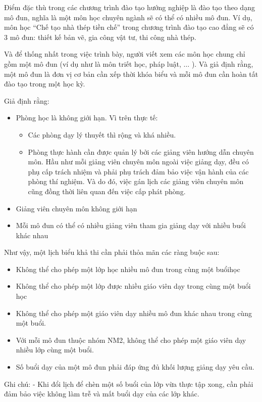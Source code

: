 \documentclass[11pt]{article}
\begin{document}
Điểm đặc thù trong các chương trình đào tạo hướng nghiệp là đào tạo theo dạng mô đun, nghĩa là một môn học chuyên ngành sẽ có thể có nhiều mô đun. Ví dụ, môn học “Chế tạo nhà thép tiền chế” trong chương trình đào tạo cao đẳng sẽ có 3 mô đun: thiết kế bản vẽ, gia công vật tư, thi công nhà thép.

Và để thống nhất trong việc trình bày, người viết xem các môn học chung chỉ gồm một mô đun (ví dụ như là môn triết học, pháp luật, $\ldots$ ). Và giả định rằng, một mô đun là đơn vị cơ bản cần xếp thời khóa biểu và mỗi mô đun cần hoàn tất đào tạo trong một học kỳ.

Giả định rằng:
\begin{itemize}
\item	Phòng học là không giới hạn. Vì trên thực tế:
\begin{itemize}
	\item Các phòng dạy lý thuyết thì rộng và khá nhiều. 
	\item Phòng thực hành cần được quản lý bởi các giảng viên hướng dẫn chuyên môn. Hầu như mỗi giảng viên chuyên môn ngoài việc giảng dạy, đều có phụ cấp trách nhiệm và phải phụ trách đảm bảo việc vận hành của các phòng thí nghiệm. Và do đó, việc gán lịch các giảng viên chuyên môn cũng đồng thời liên quan đến việc cấp phát phòng.
\end{itemize}
\item	Giảng viên chuyên môn không giới hạn 
\item	Mỗi mô đun có thể có nhiều giảng viên tham gia giảng dạy với nhiều buổi khác nhau
\end{itemize}

Như vậy, một lịch biểu khả thi cần phải thỏa mãn các ràng buộc sau:
\begin{itemize}
\item	Không thể cho phép một lớp học nhiều mô đun trong cùng một buổihọc 
\item	Không thể cho phép một lớp được nhiều giáo viên dạy trong cùng một buổi học
\item	Không thể cho phép một giáo viên dạy nhiều mô đun khác nhau trong cùng một buổi.
\item	Với mỗi mô đun thuộc nhóm NM2, không thể cho phép một giáo viên dạy nhiều lớp cùng một buổi.
\item	Số buổi dạy của một mô đun phải đáp ứng đủ khối lượng giảng dạy yêu cầu. 
\end{itemize}

Ghi chú:
-	Khi đổi lịch để chèn một số buổi của lớp vừa thực tập xong, cần phải đảm bảo việc không làm trễ và mất buổi dạy của các lớp khác.
\end{document}
